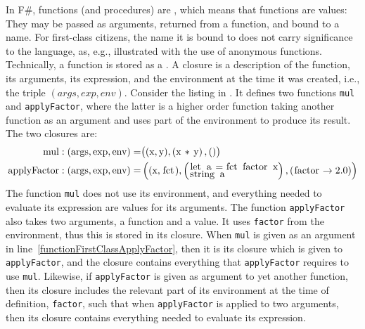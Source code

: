 In F\#, functions (and procedures) are , which means that functions are values: They may be passed as arguments, returned from a function, and bound to a name. For first-class citizens, the name it is bound to does not carry significance to the language, as, e.g., illustrated with the use of anonymous functions. Technically, a function is stored as a . A closure is a description of the function, its arguments, its expression, and the environment at the time it was created, i.e., the triple $(args, exp, env)$. Consider the listing in .
%
%
It defines two functions \lstinline{mul} and \lstinline{applyFactor}, where the latter is a higher order function taking another function as an argument and uses part of the environment to produce its result. The two closures are:
\begin{align}
  \text{\lstinline{mul}}: \left(\text{args}, \text{exp}, \text{env}\right) 
  = &\big((\text{\lstinline{x}},\text{\lstinline{y}}), \left(\text{\lstinline{x * y}}\right), ()\big)
  \\\text{\lstinline{applyFactor}}: \left(\text{args}, \text{exp}, \text{env}\right) 
  = &\left((\text{\lstinline{x}}, \text{\lstinline{fct}}), \left(\begin{subarray}{l}\displaystyle\text{\lstinline{let a = fct factor x}}\\\displaystyle\text{\lstinline{string a}}\end{subarray}\right),\left(\text{\lstinline{factor}} \rightarrow 2.0\right)\right)
\end{align}
The function \lstinline{mul} does not use its environment, and everything needed to evaluate its expression are values for its arguments. The function \lstinline{applyFactor} also takes two arguments, a function and a value. It uses \lstinline{factor} from the environment, thus this is stored in its closure. When \lstinline{mul} is given as an argument in  line~\ref{functionFirstClassApplyFactor}, then it is its closure which is given to \lstinline{applyFactor}, and the closure contains everything that \lstinline{applyFactor} requires to use \lstinline{mul}. Likewise, if \lstinline{applyFactor} is given as argument to yet another function, then its closure includes the relevant part of its environment at the time of definition, \lstinline{factor}, such that when \lstinline{applyFactor} is applied to two arguments, then its closure contains everything needed to evaluate its expression.

